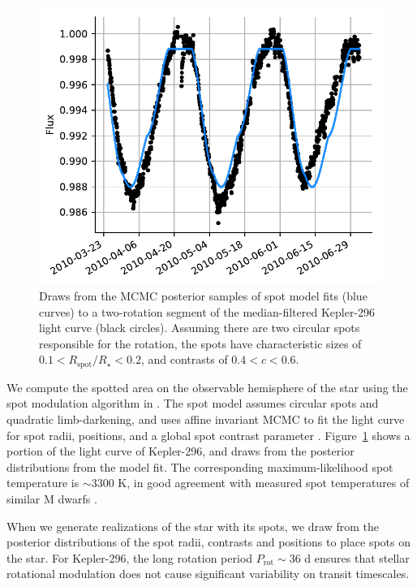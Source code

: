 \begin{figure}
\centering
\includegraphics[scale=0.6]{libra/model_kepler296_darkspots.pdf}
\caption{Draws from the MCMC posterior samples of spot model fits (blue curves) to a two-rotation segment of the median-filtered Kepler-296  light curve (black circles). Assuming there are two circular spots responsible for the rotation, the spots have characteristic sizes of $0.1 < R_\mathrm{spot}/R_\star < 0.2$, and contrasts of $0.4 < c < 0.6$.}
\label{fig:stsp_k296}
\end{figure}

We compute the spotted area on the observable hemisphere of the star using the spot modulation algorithm in \citet{Morris2018b}. The spot model assumes circular spots and quadratic limb-darkening, and uses affine invariant MCMC to fit the light curve for spot radii, positions, and a global spot contrast parameter \citep{Foreman-Mackey2013}. Figure~\ref{fig:stsp_k296} shows a portion of the \kepler light curve of Kepler-296, and draws from the posterior distributions from the model fit. The corresponding maximum-likelihood spot temperature is $\sim 3300$ K, in good agreement with measured spot temperatures of similar M dwarfs \citep{Berdyugina2005}.

When we generate realizations of the star with its spots, we draw from the posterior distributions of the spot radii, contrasts and positions to place spots on the star. For Kepler-296, the long rotation period $P_\mathrm{rot} \sim 36$ d ensures that stellar rotational modulation does not cause significant variability on transit timescales.

